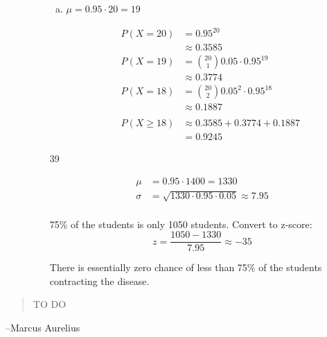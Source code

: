 \documentclass[letterpaper, landscape]{exam}
\begin{document}
\begin{description}
\begin{enumerate}[(a)]
\begin{enumerate}[(a)]
            \item 
              $\mu = 0.95 \cdot 20 = \boxed{ 19 }$

              \begin{align*}
                P(X = 20) & = 0.95^{20} \\
                          & \approx 0.3585 \\
                P(X = 19) & = \binom{20}{1} 0.05 \cdot 0.95^{19} \\
                          & \approx 0.3774 \\
                P(X = 18) & = \binom{20}{2} 0.05^2 \cdot 0.95^{18} \\
                          & \approx 0.1887 \\
                         \\
                P(X \geq 18) & \approx 0.3585 + 0.3774 + 0.1887 \\
                             & = \boxed{ 0.9245 }
              \end{align*}

          \end{enumerate}

        \item[39]
          \begin{enumerate}[(a)]
            \begin{align*}
              \mu &= 0.95 \cdot 1400 = 1330 \\
              \sigma &= \sqrt{1330 \cdot 0.95 \cdot 0.05} \approx 7.95 \\
            \end{align*}

            75\% of the students is only 1050 students. Convert to z-score:
            \[
              z = \frac{1050 - 1330}{7.95} \approx -35
            \]

            There is essentially zero chance of less than 75\% of the students
            contracting the disease.

          \end{enumerate}

      \end{enumerate}
  \end{description}

  \else
    \vspace{11 cm}
    \begin{quote}
      \begin{em}
        TO DO
      \end{em}
    \end{quote}
    \hspace{1 cm}--Marcus Aurelius
  \fi
\end{document}
